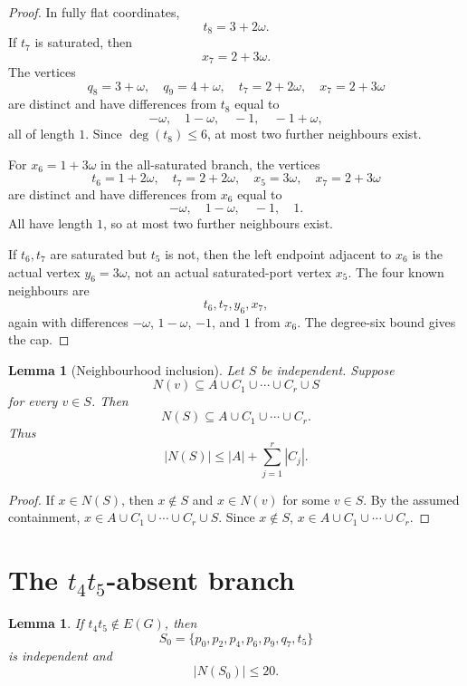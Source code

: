 \documentclass[11pt]{article}
\newtheorem{lemma}[theorem]{Lemma}
\begin{document}
\begin{proof}
In fully flat coordinates,
\[
 t_8=3+2\omega.
\]
If $t_7$ is saturated, then
\[
 x_7=2+3\omega.
\]
The vertices
\[
 q_8=3+\omega,
 \quad
 q_9=4+\omega,
 \quad
 t_7=2+2\omega,
 \quad
 x_7=2+3\omega
\]
are distinct and have differences from $t_8$ equal to
\[
 -\omega,
 \quad
 1-\omega,
 \quad
 -1,
 \quad
 -1+\omega,
\]
all of length $1$. Since $\deg(t_8)\le6$, at most two further neighbours exist.

For $x_6=1+3\omega$ in the all-saturated branch, the vertices
\[
 t_6=1+2\omega,
 \quad
 t_7=2+2\omega,
 \quad
 x_5=3\omega,
 \quad
 x_7=2+3\omega
\]
are distinct and have differences from $x_6$ equal to
\[
 -\omega,
 \quad
 1-\omega,
 \quad
 -1,
 \quad
 1.
\]
All have length $1$, so at most two further neighbours exist.

If $t_6,t_7$ are saturated but $t_5$ is not, then the left endpoint adjacent to $x_6$ is the actual vertex $y_6=3\omega$, not an actual saturated-port vertex $x_5$. The four known neighbours are
\[
 t_6,t_7,y_6,x_7,
\]
again with differences $-\omega$, $1-\omega$, $-1$, and $1$ from $x_6$. The degree-six bound gives the cap.
\end{proof}

\begin{lemma}[Neighbourhood inclusion]\label{lem:neighincl}
Let $S$ be independent. Suppose
\[
 N(v)\subseteq A\cup C_1\cup\cdots\cup C_r\cup S
\]
for every $v\in S$. Then
\[
 N(S)\subseteq A\cup C_1\cup\cdots\cup C_r.
\]
Thus
\[
 |N(S)|\le |A|+\sum_{j=1}^r |C_j|.
\]
\end{lemma}

\begin{proof}
If $x\in N(S)$, then $x\notin S$ and $x\in N(v)$ for some $v\in S$. By the assumed containment, $x\in A\cup C_1\cup\cdots\cup C_r\cup S$. Since $x\notin S$, $x\in A\cup C_1\cup\cdots\cup C_r$.
\end{proof}

\section{The $t_4t_5$-absent branch}

\begin{lemma}\label{lem:S0}
If $t_4t_5\notin E(G)$, then
\[
 S_0=\{p_0,p_2,p_4,p_6,p_9,q_7,t_5\}
\]
is independent and
\[
 |N(S_0)|\le20.
\]
\end{lemma}
\end{document}

